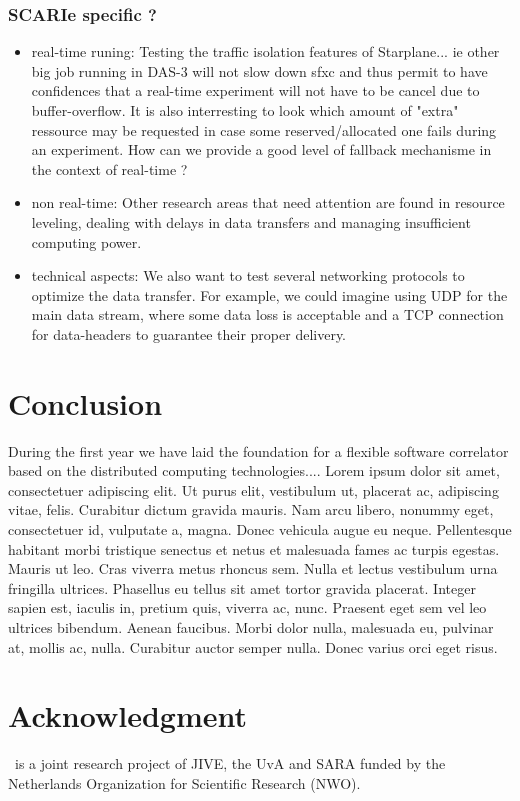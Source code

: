 \subsubsection{SCARIe specific ?}
\begin{itemize}
\item real-time runing: Testing the traffic isolation features of Starplane... ie other big job running 
in DAS-3 will not slow down sfxc and thus permit to have confidences 
that a real-time experiment will not have to be cancel due to 
buffer-overflow. It is also interresting to look which amount of "extra" ressource
may be requested in case some reserved/allocated one fails during an experiment. 
How can we provide a good level of fallback mechanisme in the context of real-time ?
\item non real-time: Other research areas that need attention are found in resource
leveling, dealing with delays in data transfers and managing
insufficient computing power.
\item technical aspects: We also want to test several networking protocols to optimize the data
transfer. For example, we could imagine using UDP for the main data
stream, where some data loss is acceptable and a TCP connection for
data-headers to guarantee their proper delivery.
\end{itemize}


\section{Conclusion}
During the first year we have laid the foundation for a flexible software correlator based on 
the distributed computing technologies....
Lorem ipsum dolor sit amet, consectetuer
adipiscing elit. Ut purus elit, vestibulum ut, placerat ac,
adipiscing vitae, felis. Curabitur dictum gravida mauris. Nam arcu
libero, nonummy eget, consectetuer id, vulputate a, magna. Donec
vehicula augue eu neque. Pellentesque habitant morbi tristique
senectus et netus et malesuada fames ac turpis egestas. Mauris ut
leo. Cras viverra metus rhoncus sem. Nulla et lectus vestibulum urna
fringilla ultrices. Phasellus eu tellus sit amet tortor gravida
placerat. Integer sapien est, iaculis in, pretium quis, viverra ac,
nunc. Praesent eget sem vel leo ultrices bibendum. Aenean faucibus.
Morbi dolor nulla, malesuada eu, pulvinar at, mollis ac, nulla.
Curabitur auctor semper nulla. Donec varius orci eget risus. 

\section{Acknowledgment}
\scarie\ is a joint research project 
of JIVE, the UvA and SARA funded by the Netherlands Organization for Scientific Research (NWO).


